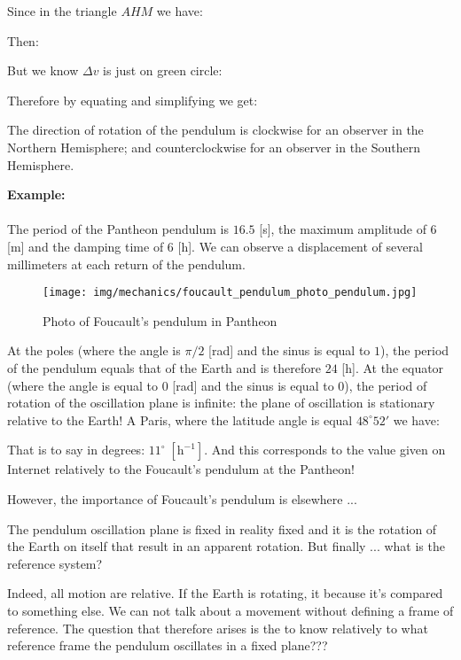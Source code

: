 	Since in the triangle $AHM$ we have:
	
	Then:
	
	But we know $\Delta v$ is just on green circle:
	
	Therefore by equating and simplifying we get:
	
	\begin{tcolorbox}[title=Remark,colframe=black,arc=10pt]
	The direction of rotation of the pendulum is clockwise for an observer  in the Northern Hemisphere; and counterclockwise for an observer in the Southern Hemisphere.
	\end{tcolorbox}
	\begin{tcolorbox}[colframe=black,colback=white,sharp corners]
	\textbf{{\Large {}}Example:}\\\\
	The period of the Pantheon pendulum is $16.5$ [s], the maximum amplitude of $6$ [m] and the damping time of $6$ [h]. We can observe a displacement of several millimeters at each return of the pendulum.
	\begin{figure}[H]
		\centering
		\texttt{[image: img/mechanics/foucault\_pendulum\_photo\_pendulum.jpg]}
		\caption[]{Photo of Foucault's pendulum in Pantheon}
	\end{figure}
	At the poles (where the angle is $\pi/2$ [rad] and the sinus is equal to $1$), the period of the pendulum equals that of the Earth and is therefore $24$ [h]. At the equator (where the angle is equal to 0 [rad] and the sinus is equal to $0$), the period of rotation of the oscillation plane is infinite: the plane of oscillation is stationary relative to the Earth! A Paris, where the latitude angle is equal $48^{\circ} 52'$ we have:
	
	That is to say in degrees: $11^{\circ}\;[\text{h}^{-1}]$. And this corresponds to the value given on Internet relatively to the Foucault's pendulum at the Pantheon!
	\end{tcolorbox}
	However, the importance of Foucault's pendulum is elsewhere ...

	The pendulum oscillation plane is fixed in reality fixed and it is the rotation of the Earth on itself that result in an apparent rotation. But finally ... what is the reference system?

	Indeed, all motion are relative. If the Earth is rotating, it because it's compared to something else. We can not talk about a movement without defining a frame of reference. The question that therefore arises is the to know relatively to what reference frame the pendulum oscillates in a fixed plane???
	
